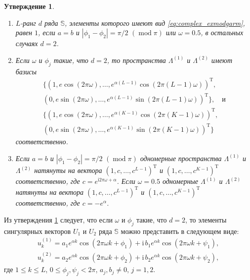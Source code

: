 \documentclass[specialist,
               substylefile = spbu.rtx,
               subf,href,colorlinks=true, 12pt]{disser}
\def\mod{\mathop{\mathrm{mod}}}
\newcommand{\I}{\mathrm{i}}
\newtheorem{Th}{Утверждение}
\begin{document}
\begin{Th} \cite[Утверждение 3]{Zhornikova2016} \label{th:cssa_ex_mod_im_vec}
\begin{enumerate}
\item $L$-ранг $d$ ряда $\mathbb{S}$, элементы которого имеют вид \eqref{eq:complex_exmodgarm},  равен $1$, если $a=b$ и $|\phi_1 - \phi_2| = \pi/2 \,\,(\mod \pi)$ или $\omega = 0.5$, в остальных случаях $d=2$.
\item Если $\omega$ и $\phi_j$ такие, что $d = 2$, то пространства $\Lambda^{(1)}$ и $\Lambda^{(2)}$ имеют базисы
\begin{gather*}
\{(1, e\cos(2\pi\omega),\ldots,e^{\alpha (L-1)}\cos(2\pi (L-1) \omega))^{\mathrm{T}}, \\
(0, e\sin(2\pi\omega),\ldots,e^{\alpha (L-1)}\sin(2\pi (L-1) \omega))^{\mathrm{T}}\},  \quad \text{и} \\
\{(1, e\cos(2\pi\omega),\ldots,e^{\alpha (K-1)}\cos(2\pi (K-1) \omega))^{\mathrm{T}}, \\
(0, e\sin(2\pi\omega),\ldots,e^{\alpha (K-1)}\sin(2\pi (K-1) \omega))^{\mathrm{T}}\}
\end{gather*}
соответственно.
\item Если 
 $a=b$ и $|\phi_1 - \phi_2| = \pi/2 \,\,(\mod \pi)$ одномерные пространства $\Lambda^{(1)}$ и $\Lambda^{(2)}$ натянуты на вектора $(1,c,\ldots,c^{L-1})^{\mathrm{T}}$ и $(1,c,\ldots,c^{K-1})^{\mathrm{T}}$ соответственно, где $c = e^{\I 2\pi\omega + \alpha}$. Если $\omega = 0.5$ одномерные $\Lambda^{(1)}$ и $\Lambda^{(2)}$ натянуты на вектора $(1,c,\ldots,c^{L-1})^{\mathrm{T}}$ и $(1,c,\ldots,c^{K-1})^{\mathrm{T}}$ соответственно, где $c = -e^{\alpha}$.
\end{enumerate}
\end{Th}
 
 Из утверждения \ref{th:cssa_ex_mod_im_vec} следует, что если $\omega$ и $\phi_j$ такие, что $d = 2$, то элементы сингулярных векторов $U_1$ и $U_2$ ряда $\mathbb{S}$ можно представить в следующем виде:
\begin{gather} \label{eq:uuu1}
	u_k^{(1)} = a_1 e^{\alpha k} \cos(2\pi\omega k + \phi_1) + \I \, b_1 e^{\alpha k} \cos(2\pi\omega k + \psi_1),\\ \label{eq:uuu2}
	u_k^{(2)} = a_2 e^{\alpha k}\cos(2\pi\omega k + \phi_2)+ \I \, b_2 e^{\alpha k} \cos(2\pi\omega k + \psi_2), 
\end{gather}
где $1 \leqslant k \leqslant L$, $0 \leqslant \phi_j, \psi_j < 2\pi$, $a_j, b_j \not = 0$, $j=1,2$.
\end{document}
